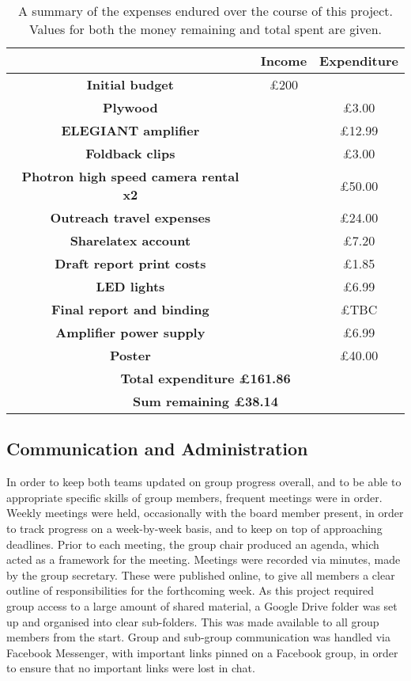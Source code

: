 \bigskip                    
\begin{table}
\centering
\begin{tabular}{|c|c|c|}
\hline
&\textbf{Income}& \textbf{Expenditure}\\
\hline
\textbf{Initial budget}& \pounds200&  \\
\textbf{Plywood}& &\pounds3.00  \\
\textbf{ELEGIANT amplifier}& &\pounds12.99  \\
\textbf{Foldback clips}& &\pounds3.00  \\
\textbf{Photron high speed camera rental x2}& &\pounds50.00  \\
\textbf{Outreach travel expenses}& &\pounds24.00  \\
\textbf{Sharelatex account}& &\pounds7.20  \\
\textbf{Draft report print costs}& &\pounds1.85  \\
\textbf{LED lights}& &\pounds6.99  \\
\textbf{Final report and binding}& &\pounds TBC  \\
\textbf{Amplifier power supply}& &\pounds6.99  \\
\textbf{Poster}& &\pounds 40.00  \\
\hline
\multicolumn{3}{|c|}{\textbf{Total expenditure \pounds161.86}}\\
\hline
\multicolumn{3}{|c|}{\textbf{Sum remaining \pounds38.14}}\\
\hline
\end{tabular}
\caption{A summary of the expenses endured over the course of this project. Values for both the money remaining and total spent are given.}
\label{table:budget}
\end{table}


\subsection{Communication and Administration}
In order to keep both teams updated on group progress overall, and to be able to appropriate specific skills of group members, frequent meetings were in order. Weekly meetings were held, occasionally with the board member present, in order to track progress on a week-by-week basis, and to keep on top of approaching deadlines. Prior to each meeting, the group chair produced an agenda, which acted as a framework for the meeting. Meetings were recorded via minutes, made by the group secretary. These were published online, to give all members a clear outline of responsibilities for the forthcoming week. As this project required group access to a large amount of shared material, a Google Drive folder was set up and organised into clear sub-folders. This was made available to all group members from the start. Group and sub-group communication was handled via Facebook Messenger, with important links pinned on a Facebook group, in order to ensure that no important links were lost in chat. 

